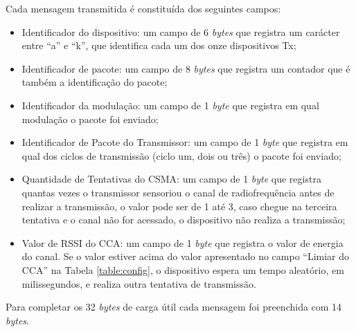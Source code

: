 Cada mensagem transmitida é constituída dos seguintes campos:
\begin{itemize}
  \label{table:estruturaTx}
  \item Identificador do dispositivo: um campo de 6 \emph{bytes} que registra um carácter entre ``a'' e ``k'', que identifica cada um dos onze dispositivos Tx;
  \item Identificador de pacote: um campo de 8 \emph{bytes} que registra um contador que é também a identificação do pacote;
  \item Identificador da modulação: um campo de 1 \emph{byte} que registra em qual modulação o pacote foi enviado;
  \item Identificador de Pacote do Transmissor: um campo de 1 \emph{byte} que registra em qual dos ciclos de transmissão (ciclo um, dois ou três) o pacote foi enviado;
  \item Quantidade de Tentativas do CSMA: um campo de 1 \emph{byte} que registra quantas vezes o transmissor sensoriou o canal de radiofrequência antes de realizar a transmissão, o valor pode ser de 1 até 3, caso chegue na terceira tentativa e o canal não for acessado, o dispositivo não realiza a transmissão;
  \item Valor de RSSI do CCA: um campo de 1 \emph{byte} que registra o valor de energia do canal. Se o valor estiver acima do valor apresentado no campo ``Limiar do CCA'' na Tabela \ref{table:config}, o dispositivo espera um tempo aleatório, em milissegundos, e realiza outra tentativa de transmissão.
\end{itemize}

Para completar os 32 \emph{bytes} de carga útil cada mensagem foi preenchida com 14 \emph{bytes}.

